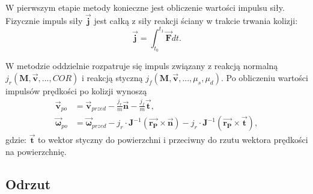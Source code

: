 W pierwszym etapie metody konieczne jest obliczenie wartości impulsu siły. Fizycznie impuls siły $\bm{\vec{j}}$ jest całką z siły reakcji ściany w trakcie trwania kolizji:
\[
	 \bm{\vec{j}} = \int_{t_0}^{t_1} \bm{\vec{F}} dt.
\]

W metodzie oddzielnie rozpatruje się impuls związany z reakcją normalną\\ $j_r \left( \bm{M}, \bm{\vec{v}}, ...  , COR \right)$ i reakcją styczną $j_f \left( \bm{M}, \bm{\vec{v}}, ...  , \mu_s, \mu_d \right)$. Po obliczeniu wartości impulsów prędkości po kolizji wynoszą 
\[
	\begin{aligned}
	\bm{\vec{v}}_{po} & = \bm{\vec{v}}_{przed} - \frac{j_r}{m} \bm{\vec{n}} - \frac{j_f}{m} \bm{\vec{t}},  \\
	\bm{\vec{\omega}}_{po} & = \bm{\vec{\omega}}_{przed} - j_r \cdot \bm{J}^{-1} \left(  \bm{\vec{r_P}} \times \bm{\vec{n}} \right) - j_r \cdot \bm{J}^{-1} \left(  \bm{\vec{r_P}} \times \bm{\vec{t}} \right),
	\end{aligned}
\]
gdzie: $\bm{\vec{t}}$ to wektor styczny do powierzchni i przeciwny do rzutu wektora prędkości na powierzchnię.

\subsection{Odrzut}

